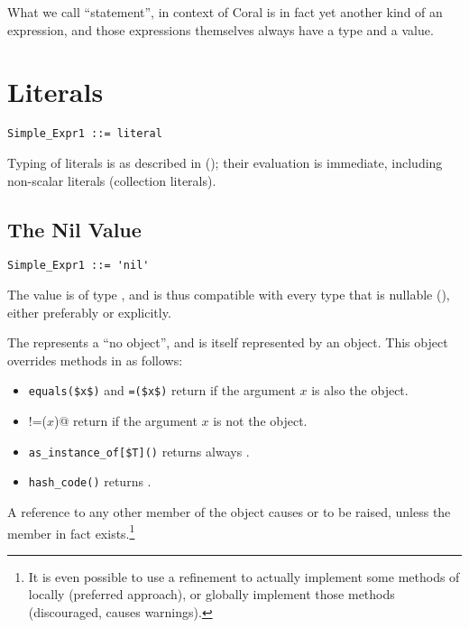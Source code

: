 What we call ``statement'', in context of Coral is in fact yet another kind of an expression, and those expressions themselves always have a type and a value. 





\section{Literals}

\syntax\begin{lstlisting}
Simple_Expr1 ::= literal
\end{lstlisting}

Typing of literals is as described in (); their evaluation is immediate, including non-scalar literals (collection literals). 






\subsection{The Nil Value}

\syntax\begin{lstlisting}
Simple_Expr1 ::= 'nil'
\end{lstlisting}

The  value is of type , and is thus compatible with every type that is nullable (), either preferably or explicitly.

The  represents a ``no object'', and is itself represented by an object. This object overrides methods in  as follows: 
\begin{itemize}
\item 
\lstinline!equals($x$)! and \lstinline!=($x$)! return  if the argument $x$ is also the  object. 

\item 
\lstinline@!=($x$)@ return  if the argument $x$ is not the  object.

\item
\lstinline[mathescape=false]!as_instance_of[$T]()! returns always . 

\item
\lstinline!hash_code()! returns . 
\end{itemize}

A reference to any other member of the  object causes  or  to be raised, unless the member in fact exists.\footnote{It is even possible to use a refinement to actually implement some methods of  locally (preferred approach), or globally implement those methods (discouraged, causes warnings).} 







